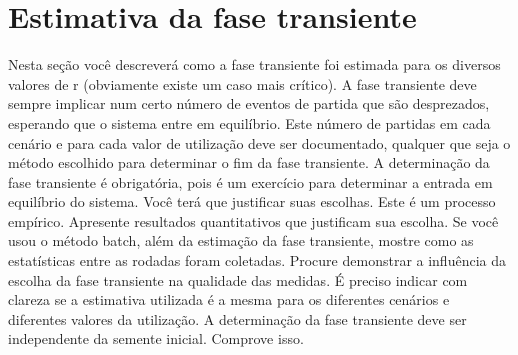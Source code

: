 \chapter{Estimativa da fase transiente}
\label{chap:estimativa}

Nesta seção você descreverá como a fase transiente foi estimada para os diversos valores de
r (obviamente existe um caso mais crítico). A fase transiente deve sempre implicar num
certo número de eventos de partida que são desprezados, esperando que o sistema entre em
equilíbrio. Este número de partidas em cada cenário e para cada valor de utilização deve ser
documentado, qualquer que seja o método escolhido para determinar o fim da fase
transiente.
A determinação da fase transiente é obrigatória, pois é um exercício para determinar a
entrada em equilíbrio do sistema. Você terá que justificar suas escolhas. Este é um processo
empírico.
Apresente resultados quantitativos que justificam sua escolha. Se você usou o método
batch, além da estimação da fase transiente, mostre como as estatísticas entre as rodadas
foram coletadas.
Procure demonstrar a influência da escolha da fase transiente na qualidade das medidas.
É preciso indicar com clareza se a estimativa utilizada é a mesma para os diferentes
cenários e diferentes valores da utilização. A determinação da fase transiente deve ser
independente da semente inicial. Comprove isso.
